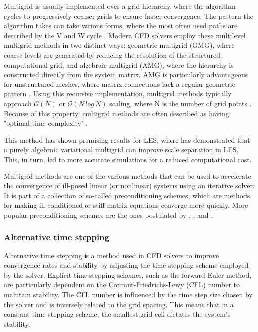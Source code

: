 Multigrid is usually implemented over a grid hierarchy, where the algorithm cycles to progressively coarser grids to ensure faster convergence. The pattern the algorithm takes can take various forms, where the most often used paths are described by the V and W cycle \cite{Driss2018}. Modern CFD solvers employ these multilevel multigrid methods in two distinct ways: geometric multigrid (GMG), where coarse levels are generated by reducing the resolution of the structured computational grid, and algebraic multigrid (AMG), where the hierarchy is constructed directly from the system matrix. AMG is particularly advantageous for unstructured meshes, where matrix connections lack a regular geometric pattern \cite{Driss2018}. Using this recursive implementation, multigrid methods typically approach $\mathcal{O}(N)$ or $\mathcal{O}(N \: log \, N)$ scaling, where N is the number of grid points \cite{Germaschewski2005}. Because of this property, multigrid methods are often described as having "optimal time complexity" \cite{Lhner2013}.

This method has shown promising results for LES, where \textcite{Gravemeier2010} has demonstrated that a purely algebraic variational multigrid can improve scale separation in LES. This, in turn, led to more accurate simulations for a reduced computational cost. 

Multigrid methods are one of the various methods that can be used to accelerate the convergence of ill-posed linear (or nonlinear) systems using an iterative solver. It is part of a collection of so-called preconditioning schemes, which are methods for making ill-conditioned or stiff matrix equations converge more quickly. More popular preconditioning schemes are the ones postulated by \textcite{Turkel1999}, \textcite{Weiss1994}, \textcite{Meijerink1977} and \textcite{Chapman2000}.

\subsubsection{Alternative time stepping}
Alternative time stepping is a method used in CFD solvers to improve convergence rates and stability by adjusting the time stepping scheme employed by the solver. Explicit time-stepping schemes, such as the forward Euler method, are particularly dependent on the Courant-Friedrichs-Lewy (CFL) number to maintain stability. The CFL number is influenced by the time step size chosen by the solver and is inversely related to the grid spacing. This means that in a constant time stepping scheme, the smallest grid cell dictates the system's stability.

